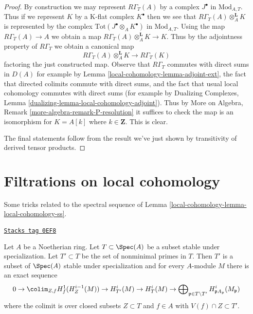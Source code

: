 \begin{proof}
By construction we may represent $R\Gamma_T(A)$ by a complex $J^\bullet$ in
$\text{Mod}_{A, T}$. Thus if we represent $K$ by a K-flat complex $K^\bullet$
then we see that $R\Gamma_T(A) \otimes_A^\mathbf{L} K$ is represented
by the complex $\text{Tot}(J^\bullet \otimes_A K^\bullet)$ in
$\text{Mod}_{A, T}$. Using the map $R\Gamma_T(A) \to A$ we obtain
a map $R\Gamma_T(A) \otimes_A^\mathbf{L} K\to K$. Thus by the adjointness
property of $R\Gamma_T$ we obtain a canonical map
$$
R\Gamma_T(A) \otimes_A^\mathbf{L} K \longrightarrow R\Gamma_T(K)
$$
factoring the just constructed map. Observe that $R\Gamma_T$ commutes
with direct sums in $D(A)$ for example by Lemma \ref{local-cohomology-lemma-adjoint-ext},
the fact that directed colimits commute with direct sums, and the
fact that usual local cohomology commutes with direct sums
(for example by Dualizing Complexes, Lemma
\ref{dualizing-lemma-local-cohomology-adjoint}).
Thus by More on Algebra, Remark \ref{more-algebra-remark-P-resolution}
it suffices to check the map is an isomorphism for
$K = A[k]$ where $k \in \mathbf{Z}$. This is clear.

\medskip\noindent
The final statements follow from the result we've just shown
by transitivity of derived tensor products.
\end{proof}

\section{Filtrations on local cohomology}
\label{local-cohomology-section-filter-local-cohomology}
Some tricks related to the spectral sequence of
Lemma \ref{local-cohomology-lemma-local-cohomology-ss}.

\begin{lemma}
\label{local-cohomology-lemma-filter-local-cohomology}
\href{https://stacks.math.columbia.edu/tag/0EF8}{\texttt{Stacks tag 0EF8}}

Let $A$ be a Noetherian ring. Let $T \subset \Spec(A)$
be a subset stable under specialization. Let $T' \subset T$ be
the set of nonminimal primes in $T$. Then $T'$
is a subset of $\Spec(A)$ stable under specialization
and for every $A$-module $M$ there is an exact sequence
$$
0 \to
\colim_{Z, f} H^1_f(H^{i - 1}_Z(M)) \to
H^i_{T'}(M) \to H^i_T(M) \to
\bigoplus\nolimits_{\mathfrak p \in T \setminus T'}
H^i_{\mathfrak p A_\mathfrak p}(M_\mathfrak p)
$$
where the colimit is over closed subsets $Z \subset T$
and $f \in A$ with $V(f) \cap Z \subset T'$.
\end{lemma}

